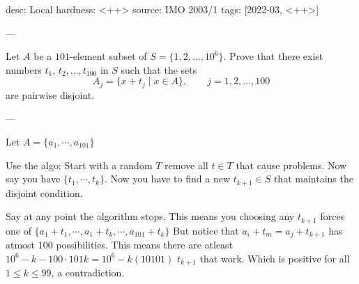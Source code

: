 desc: Local
hardness: <++>
source: IMO 2003/1
tags: [2022-03, <++>]

---

Let $A$ be a $101$-element subset of $S=\{1,2,\ldots,10^6\}$.
Prove that there exist numbers $t_1$, $t_2, \ldots, t_{100}$
in $S$ such that the sets
\[ A_j=\{x+t_j\mid x\in A\},\qquad j=1,2,\ldots,100  \]
are pairwise disjoint.

---

Let $A=\{a_1, \cdots, a_{101}\}$

Use the algo: Start with a random $T$ remove all $t \in T$ that cause
problems. Now say you have $\{t_1,\cdots,t_k\}$. Now you have to find a
new $t_{k+1} \in S$ that maintains the disjoint condition. 

Say at any point the algorithm stops. This means you choosing any
$t_{k+1}$ forces one of
$\{a_1+t_1,\cdots,a_1+t_k,\cdots,a_{101}+t_{k}\}$
But notice that $a_i + t_m = a_j + t_{k+1}$ has atmost $100$
possibilities. This means there are atleast $10^6-k - 100 \cdot 101k= 10^6 -
k(10101)$ $t_{k+1}$ that work. Which is positive for all $1\leq k \leq 99$, a contradiction.
